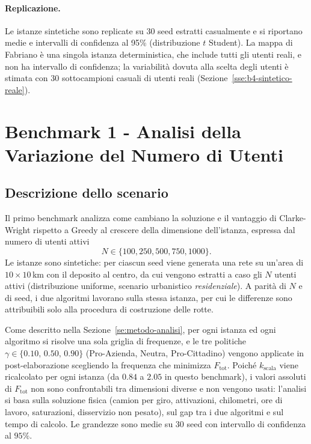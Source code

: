 \paragraph{Replicazione.}
Le istanze sintetiche sono replicate su 30 seed estratti casualmente e si riportano medie e intervalli di confidenza al 95\% (distribuzione $t$ Student). La mappa di Fabriano è una singola istanza deterministica, che include tutti gli utenti reali, e non ha intervallo di confidenza; la variabilità dovuta alla scelta degli utenti è stimata con 30 sottocampioni casuali di utenti reali (Sezione~\ref{sse:b4-sintetico-reale}).


\section{Benchmark 1 - Analisi della Variazione del Numero di Utenti}\label{se:b1}

\subsection{Descrizione dello scenario}

Il primo benchmark analizza come cambiano la soluzione e il vantaggio di Clarke-Wright rispetto a Greedy al crescere della dimensione dell'istanza, espressa dal numero di utenti attivi
\[
N \in \{100,250,500,750,1000\}.
\]
Le istanze sono sintetiche: per ciascun seed viene generata una rete su un'area di $10\times10$\,km con il deposito al centro, da cui vengono estratti a caso gli $N$ utenti attivi (distribuzione uniforme, scenario urbanistico \textit{residenziale}). A parità di $N$ e di seed, i due algoritmi lavorano sulla stessa istanza, per cui le differenze sono attribuibili solo alla procedura di costruzione delle rotte.

Come descritto nella Sezione~\ref{se:metodo-analisi}, per ogni istanza ed ogni algoritmo si risolve una sola griglia di frequenze, e le tre politiche $\gamma\in\{0.10,\,0.50,\,0.90\}$ (Pro-Azienda, Neutra, Pro-Cittadino) vengono applicate in post-elaborazione scegliendo la frequenza che minimizza $F_{\mathrm{tot}}$. Poiché $k_{\mathrm{scala}}$ viene ricalcolato per ogni istanza (da $0.84$ a $2.05$ in questo benchmark), i valori assoluti di $F_{\mathrm{tot}}$ non sono confrontabili tra dimensioni diverse e non vengono usati: l'analisi si basa sulla soluzione fisica (camion per giro, attivazioni, chilometri, ore di lavoro, saturazioni, disservizio non pesato), sul gap tra i due algoritmi e sul tempo di calcolo. Le grandezze sono medie su 30 seed con intervallo di confidenza al $95\%$.

